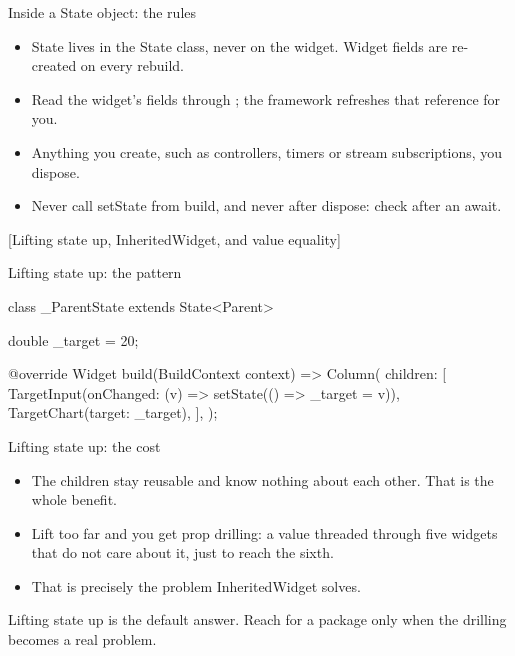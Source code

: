 \documentclass[10pt,aspectratio=169,t]{beamer}
\begin{document}
\begin{frame}[eyebrow=State]{Inside a State object: the rules}
  \vskip 3mm
  \begin{itemize}
    \item State lives in the State class, never on the widget. Widget fields are re-created on every rebuild.
    \item Read the widget's fields through ; the framework refreshes that reference for you.
    \item Anything you create, such as controllers, timers or stream subscriptions, you dispose.
    \item Never call setState from build, and never after dispose: check  after an await.
  \end{itemize}
\end{frame}

[Lifting state up, InheritedWidget, and value equality]

\begin{frame}[fragile,eyebrow=Sharing state]{Lifting state up: the pattern}
\begin{dart}
class _ParentState extends State<Parent> {
  double _target = 20;

  @override
  Widget build(BuildContext context) => Column(
    children: [
      TargetInput(onChanged: (v) => setState(() => _target = v)),
      TargetChart(target: _target),
    ],
  );
}
\end{dart}
\end{frame}

\begin{frame}[eyebrow=Sharing state]{Lifting state up: the cost}
  \vskip 3mm
  \begin{itemize}
    \item The children stay reusable and know nothing about each other. That is the whole benefit.
    \item Lift too far and you get prop drilling: a value threaded through five widgets that do not care about it, just to reach the sixth.
    \item That is precisely the problem InheritedWidget solves.
  \end{itemize}
  \vskip 4mm
  \begin{takeaway}{Lifting state up is the default answer.}
    Reach for a package only when the drilling becomes a real problem.
  \end{takeaway}
\end{frame}
\end{document}
